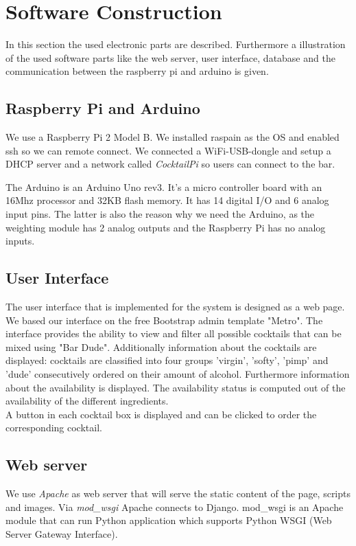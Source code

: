 \documentclass{acm_proc_article-sp}
\begin{document}
\section{Software Construction}
In this section the used electronic parts are described. Furthermore a illustration of the used software parts like the web server, user interface, database and the communication between the raspberry pi and arduino is given.

\subsection{Raspberry Pi and Arduino}
We use a Raspberry Pi 2 Model B. We installed raspain as the OS and enabled ssh so we can remote connect. We connected a WiFi-USB-dongle and setup a DHCP server and a network called \textit{CocktailPi} so users can connect to the bar.

The Arduino is an Arduino Uno rev3. It's a micro controller board with an 16Mhz processor and 32KB flash memory. It has 14 digital I/O and 6 analog input pins. The latter is also the reason why we need the Arduino, as the weighting module has 2 analog outputs and the Raspberry Pi has no analog inputs.
 
\subsection{User Interface}
The user interface that is implemented for the system is designed as a web page. We based our interface on the free Bootstrap admin template "Metro". The interface provides the ability to view and filter all possible cocktails that can be mixed using "Bar Dude". Additionally information about the cocktails are displayed: cocktails are classified into four groups 'virgin', 'softy', 'pimp' and 'dude' consecutively ordered on their amount of alcohol. Furthermore information about the availability is displayed. The availability status is computed out of the availability of the different ingredients. \\
A button in each cocktail box is displayed and can be clicked to order the corresponding cocktail.

\subsection{Web server}\label{sec:web server}
We use \textit{Apache} as web server that will serve the static content of the page, scripts and images. Via \textit{mod\_wsgi} Apache connects to Django. mod\_wsgi is an Apache module that can run Python application which supports Python WSGI (Web Server Gateway Interface).
\end{document}
